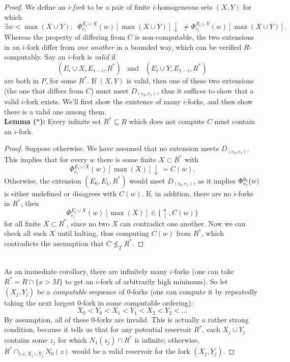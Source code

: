 \documentclass{amsart}
\begin{document}
\begin{proof}
		
		We define an $i$-\textit{fork} to be a pair of finite $i$-homogeneous sets $(X,Y)$ for which
		$$\exists w< \max(X\cup Y): \;\; \Phi_{e_i}^{E_i\cup X}(w)[\max(X\cup Y)] \downarrow \; \neq \Phi_{e_i}^{E_i\cup Y}(w)[\max(X\cup Y)].$$
		Whereas the property of differing from $C$ is non-computable, the two extensions in an $i$-fork differ from \textit{one another} in a bounded way, which can be verified $R$-computably. Say an $i$-fork is \textit{valid} if 
		$$(E_i\cup X,E_{1-i},R^*) \;\;\; \text{and}\;\;\; (E_i\cup Y,E_{1-i},R^*)$$ are both in $P$, for some $R^*$. If $(X,Y)$ is valid, then one of these two extensions (the one that differs from $C$) must meet $D_{(e_0,e_1)}$, thus it suffices to show that a valid $i$-fork exists. 
		We'll first show the existence of many $i$-forks, and then show there is a valid one among them.\\
		
		\noindent \textbf{Lemma ($\ast$):} Every infinite set $R^*\subseteq R$ which does not compute $C$ must contain an $i$-fork.
		
		\begin{proof}
			Suppose otherwise. We have assumed that no extension meets $D_{(e_0,e_1)}$. This implies that for every $w$ there is some finite $X\subset R^*$ with
			$$
			\Phi_{e_i}^{E_i\cup X}(w)[\max(X)] \downarrow \, = C(w).
			$$
			Otherwise, the extension $(E_0,E_1,R^*)$ would meet $D_{(e_0,e_1)}$, as it implies $\Phi_{e_i}^{\tt{G_i}}(w)$ is either undefined or disagrees with $C(w)$. If, in addition, there are no $i$-forks in $R^*$, then 
			$$
			\Phi_{e_i}^{E_i\cup X}(w)[\max(X)] \in \{\uparrow,C(w)\}
			$$
			for all finite $X\subset R^*$, since no two $X$ can contradict one another. Now we can check all such $X$ until halting, thus computing $C(w)$ from $R^*$, which contradicts the assumption that $C\nleq_T R^*$.
		\end{proof}\\
		
		As an immediate corollary, there are infinitely many $i$-forks (one can take $R^* = R\cap \{x>M\}$ to get an $i$-fork of arbitrarily high minimum). So let $(X_j,Y_j)$ be a \textit{computable} sequence of $0$-forks (one can compute it by repeatedly taking the next largest $0$-fork in some computable ordering):
		$$
		X_0 < Y_0 < X_1 < Y_1 < X_2 < Y_2 < \dots
		$$
		By assumption, all of these $0$-forks are invalid. This is actually a rather strong condition, because it tells us that for any potential reservoir $R^*$, each $X_j\cup Y_j$ contains some $z_j$ for which $N_1(z_j)\cap R^*$ is infinite; otherwise, $R^* \cap_{z\in X_j\cup Y_j} N_0(z)$ would be a valid reservoir for the fork $(X_j,Y_j)$. 
		

\end{proof}
\end{document}
